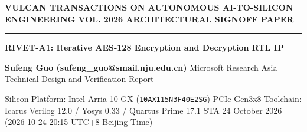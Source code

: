 \documentclass[11pt,a4paper]{article}
\begin{document}
{\scriptsize\sffamily\textcolor{vulcan}{\textbf{VULCAN TRANSACTIONS ON AUTONOMOUS AI-TO-SILICON ENGINEERING \hfill VOL. 2026 \textperiodcentered{} ARCHITECTURAL SIGNOFF PAPER}}\par}

\vspace{1pt}\textcolor{vulcan}{\rule{\textwidth}{1.2pt}}\vspace{4pt}

\begin{center}

{\sffamily\LARGE\bfseries RIVET-A1: Iterative AES-128 Encryption and Decryption RTL IP\par}\vspace{3pt}

{\small\sffamily\textbf{Sufeng Guo (\allowbreak{}sufeng\_\allowbreak{}guo@smail.nju.edu.cn)\allowbreak{}} \textperiodcentered{} Microsoft Research Asia \textperiodcentered{} Technical Design and Verification Report\par}\vspace{1pt}

{\scriptsize\sffamily\textcolor{black!75}{Silicon Platform: Intel Arria 10 GX (\texttt{10AX115N3F40E2SG}) PCIe Gen3x8 \textperiodcentered{} Toolchain: Icarus Verilog 12.0 / Yosys 0.33 / Quartus Prime 17.1 STA \textperiodcentered{} 24 October 2026 (\allowbreak{}2026-10-24 20:15 UTC+\allowbreak{}8 Beijing Time)\allowbreak{}}\par}

\end{center}\vspace{2pt}
\end{document}
